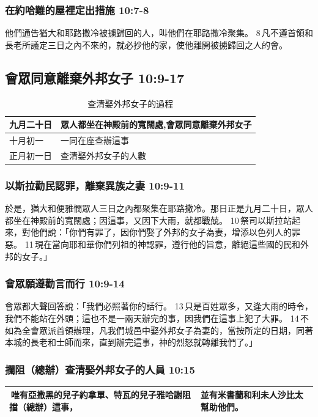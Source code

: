 \subsubsection{在約哈難的屋裡定出措施 10:7-8}
他們通告猶大和耶路撒冷被擄歸回的人，叫他們在耶路撒冷聚集。 8 凡不遵首領和長老所議定三日之內不來的，就必抄他的家，使他離開被擄歸回之人的會。

\subsection{會眾同意離棄外邦女子 10:9-17}
\begin{table}[H]
\centering 
\begin{tabular}{p{2cm}|p{8cm}}\hline\hline
九月二十日&眾人都坐在神殿前的寬闊處,會眾同意離棄外邦女子\\\hline
十月初一&一同在座查辦這事\\\hline
正月初一日&查清娶外邦女子的人數\\\hline
\end{tabular}
\caption{查清娶外邦女子的過程}
\end{table}
\subsubsection{以斯拉勸民認罪，離棄異族之妻 10:9-11}
於是，猶大和便雅憫眾人三日之內都聚集在耶路撒冷。那日正是九月二十日，眾人都坐在神殿前的寬闊處；因這事，又因下大雨，就都戰兢。 10 祭司以斯拉站起來，對他們說：「你們有罪了，因你們娶了外邦的女子為妻，增添以色列人的罪惡。 11 現在當向耶和華你們列祖的神認罪，遵行他的旨意，離絕這些國的民和外邦的女子。」

\subsubsection{會眾願遵勸言而行 10:9-14}
會眾都大聲回答說：「我們必照著你的話行。 13 只是百姓眾多，又逢大雨的時令，我們不能站在外頭；這也不是一兩天辦完的事，因我們在這事上犯了大罪。 14 不如為全會眾派首領辦理，凡我們城邑中娶外邦女子為妻的，當按所定的日期，同著本城的長老和士師而來，直到辦完這事，神的烈怒就轉離我們了。」 

\subsubsection{攔阻（總辦）查清娶外邦女子的人員 10:15}
\begin{table}[H]
\centering 
\begin{tabular}{p{10.5cm}|p{6cm}}\hline\hline
 唯有亞撒黑的兒子約拿單、特瓦的兒子雅哈謝阻擋（總辦）這事，&並有米書蘭和利未人沙比太幫助他們。\\\hline
\end{tabular}
\end{table}


